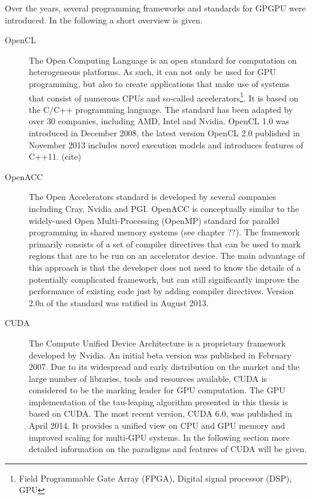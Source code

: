 Over the years, several programming frameworks and standards for GPGPU were introduced. In the following a short overview is given.  
\begin{description}
\item[OpenCL] The Open Computing Language is an open standard for computation on heterogeneous platforms. As such, it can not only be used for GPU programming, but also to create applications that make use of systems that consist of numerous CPUs and so-called accelerators\footnote{Field Programmable Gate Array (FPGA), Digital signal processor (DSP), GPU}. It is based on the C/C++ programming language. The standard has been adapted by over 30 companies, including AMD, Intel and Nvidia. OpenCL 1.0 was introduced in December 2008, the latest version OpenCL 2.0 published in November 2013 includes novel execution models and introduces features of C++11. (cite)
\item[OpenACC] The Open Accelerators standard is developed by several companies including Cray, Nvidia and PGI. OpenACC is conceptually similar to the widely-used Open Multi-Processing (OpenMP) standard for parallel programming in shared memory systems (see chapter ??). The framework primarily consists of a set of compiler directives that can be used to mark regions that are to be run on an accelerator device. The main advantage of this approach is that the developer does not need to know the details of a potentially complicated framework, but can still significantly improve the performance of existing code just by adding compiler directives. Version 2.0a of the standard was ratified in August 2013. 
\item[CUDA] The Compute Unified Device Architecture is a proprietary framework developed by Nvidia. An initial beta version was published in February 2007. Due to its widespread and early distribution on the market and the large number of libraries, tools and resources available, CUDA is considered to be the marking leader for GPU computation. The GPU implementation of the tau-leaping algorithm presented in this thesis is based on CUDA. The most recent version, CUDA 6.0, was published in April 2014. It provides a unified view on CPU and GPU memory and improved scaling for multi-GPU systems. In the following section more detailed information on the paradigms and features of CUDA will be given. 
\end{description}

